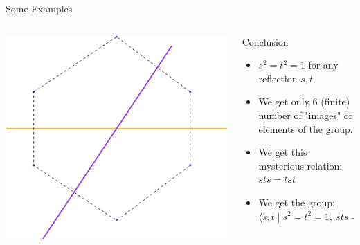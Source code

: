 \documentclass[aspectratio=169,xcolor=dvipsnames]{beamer}
\begin{document}
\begin{frame}{Some Examples}
    \begin{columns}
    
        \begin{column}{0.5\textwidth}
            \centering
            \includegraphics[width=0.9\linewidth]{frameLast.png}
        \end{column}

        \begin{column}{0.5\textwidth}
            \begin{block}{Conclusion}
                \begin{itemize}
                    \item $s^2 = t^2 = 1$ for any reflection $s, t$
                    \item We get only 6 (finite) number of "images" or elements of the group.
                    \item We get this mysterious relation: $sts = tst$
                    \item We get the group: 
                        $\langle s, t \mid s^2 = t^2 = 1,\ sts = tst \rangle$

                \end{itemize}
            \end{block}
        \end{column}

    \end{columns}
\end{frame}
\end{document}
